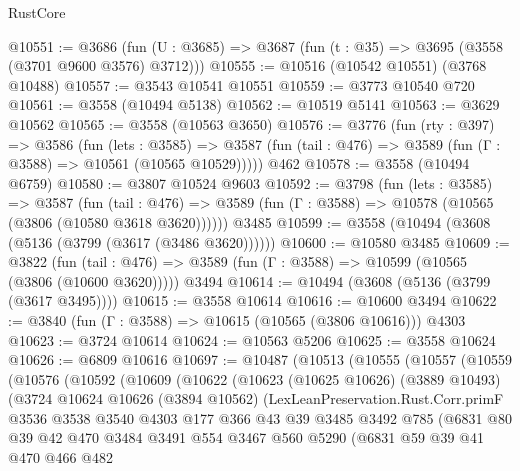 \begin{lexlean}{RustCore}
\begin{coremodule}
@10551 := @3686
    (fun (U : @3685) => @3687 (fun (t : @35) => @3695 (@3558 (@3701 @9600 @3576) @3712)))
@10555 := @10516 (@10542 @10551) (@3768 @10488)
@10557 := @3543 @10541 @10551
@10559 := @3773 @10540 @720
@10561 := @3558 (@10494 @5138)
@10562 := @10519 @5141
@10563 := @3629 @10562
@10565 := @3558 (@10563 @3650)
@10576 := @3776
    (fun (rty : @397) =>
    @3586
      (fun (lets : @3585) =>
      @3587 (fun (tail : @476) => @3589 (fun (Γ : @3588) => @10561 (@10565 @10529)))))
    @462
@10578 := @3558 (@10494 @6759)
@10580 := @3807 @10524 @9603
@10592 := @3798
    (fun (lets : @3585) =>
    @3587
      (fun (tail : @476) =>
      @3589 (fun (Γ : @3588) => @10578 (@10565 (@3806 (@10580 @3618 @3620))))))
    @3485
@10599 := @3558 (@10494 (@3608 (@5136 (@3799 (@3617 (@3486 @3620))))))
@10600 := @10580 @3485
@10609 := @3822
    (fun (tail : @476) => @3589 (fun (Γ : @3588) => @10599 (@10565 (@3806 (@10600 @3620)))))
    @3494
@10614 := @10494 (@3608 (@5136 (@3799 (@3617 @3495))))
@10615 := @3558 @10614
@10616 := @10600 @3494
@10622 := @3840 (fun (Γ : @3588) => @10615 (@10565 (@3806 @10616))) @4303
@10623 := @3724 @10614
@10624 := @10563 @5206
@10625 := @3558 @10624
@10626 := @6809 @10616
@10697 := @10487
    (@10513
      (@10555
        (@10557
          (@10559
            (@10576
              (@10592
                (@10609
                  (@10622
                    (@10623
                      (@10625 @10626)
                      (@3889 @10493)
                      (@3724
                        @10624
                        @10626
                        (@3894 @10562)
                        (LexLeanPreservation.Rust.Corr.primF
                          @3536
                          @3538
                          @3540
                          @4303
                          @177
                          @366
                          @43
                          @39
                          @3485
                          @3492
                          @785
                          (@6831
                            @80
                            @39
                            @42
                            @470
                            @3484
                            @3491
                            @554
                            @3467
                            @560
                            @5290
                            (@6831
                              @59
                              @39
                              @41
                              @470
                              @466
                              @482

\end{coremodule}
\end{lexlean}
